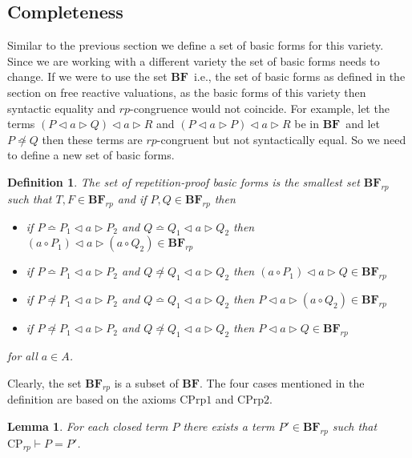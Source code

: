 \documentclass[a4paper,twoside,openright]{report}
\newcommand{\BF}{\ensuremath{\textbf{BF}}}
\newcommand{\syn}{\bumpeq}
\newcommand{\nsyn}{\not\bumpeq}
\newcommand{\CPrp}[1]{\ensuremath{\mathrm{CPrp#1}}}
\newcommand{\lef}{\ensuremath{\triangleleft}}
\newcommand{\rig}{\ensuremath{\triangleright}}
\newtheorem{lem}[theorem]{Lemma}
\newtheorem{defn}[theorem]{Definition}
\begin{document}
\subsection{Completeness}
Similar to the previous section we define a set of basic forms for this variety. Since we are working with a different variety the set of basic forms needs to change. If we were to use the set \BF\ i.e., the set of basic forms as defined in the section on free reactive valuations, as the basic forms of this variety then syntactic equality and $rp$-congruence would not coincide. For example, let the terms $(P\lef a\rig Q)\lef a\rig R$ and $(P\lef a\rig P)\lef a\rig R$ be in \BF\ and let $P\nsyn Q$ then these terms are $rp$-congruent but not syntactically equal. So we need to define a new set of basic forms.
\begin{defn}
The set of repetition-proof basic forms is the smallest set $\BF_{rp}$ such that $T,F\in\BF_{rp}$ and if $P,Q\in\BF_{rp}$ then
\begin{itemize}
\item if $P\syn P_1\lef a\rig P_2$ and $Q\syn Q_1\lef a\rig Q_2$ then $(a\circ P_1)\lef a\rig(a\circ Q_2)\in\BF_{rp}$
\item if $P\syn P_1\lef a\rig P_2$ and $Q\nsyn Q_1\lef a\rig Q_2$ then $(a\circ P_1)\lef a\rig Q\in\BF_{rp}$
\item if $P\nsyn P_1\lef a\rig P_2$ and $Q\syn Q_1\lef a\rig Q_2$ then $P\lef a\rig(a\circ Q_2)\in\BF_{rp}$
\item if $P\nsyn P_1\lef a\rig P_2$ and $Q\nsyn Q_1\lef a\rig Q_2$ then $P\lef a\rig Q\in\BF_{rp}$
\end{itemize}
for all $a\in A$.
\end{defn}
Clearly, the set $\BF_{rp}$ is a subset of $\BF$. The four cases mentioned in the definition are based on the axioms \CPrp1 and \CPrp2. 
\begin{lem}
For each closed term $P$ there exists a term $P'\in\BF_{rp}$ such
that $\text{CP}_{rp}\vdash P=P'$.
\end{lem}
\end{document}
